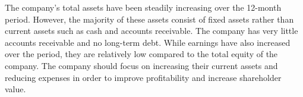 The company's total assets have been steadily increasing over the 12-month period. However, the majority of these assets consist of fixed assets rather than current assets such as cash and accounts receivable. The company has very little accounts receivable and no long-term debt. While earnings have also increased over the period, they are relatively low compared to the total equity of the company. The company should focus on increasing their current assets and reducing expenses in order to improve profitability and increase shareholder value.